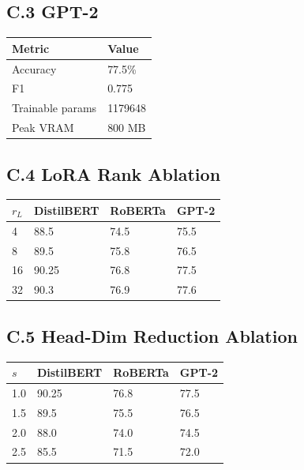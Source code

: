 \subsection{C.3 GPT-2}

\begin{table}[H]
\centering
\small
\begin{tabular}{ll}
\toprule
\textbf{Metric} & \textbf{Value} \\
\midrule
Accuracy & 77.5\% \\
F1 & 0.775 \\
Trainable params & 1179648 \\
Peak VRAM & 800 MB \\
\bottomrule
\end{tabular}
\end{table}

\subsection{C.4 LoRA Rank Ablation}

\begin{table}[H]
\centering
\small
\begin{tabular}{llll}
\toprule
\textbf{$r_L$} & \textbf{DistilBERT} & \textbf{RoBERTa} & \textbf{GPT-2} \\
\midrule
4 & 88.5 & 74.5 & 75.5 \\
8 & 89.5 & 75.8 & 76.5 \\
16 & 90.25 & 76.8 & 77.5 \\
32 & 90.3 & 76.9 & 77.6 \\
\bottomrule
\end{tabular}
\end{table}

\subsection{C.5 Head-Dim Reduction Ablation}

\begin{table}[H]
\centering
\small
\begin{tabular}{llll}
\toprule
\textbf{$s$} & \textbf{DistilBERT} & \textbf{RoBERTa} & \textbf{GPT-2} \\
\midrule
1.0 & 90.25 & 76.8 & 77.5 \\
1.5 & 89.5 & 75.5 & 76.5 \\
2.0 & 88.0 & 74.0 & 74.5 \\
2.5 & 85.5 & 71.5 & 72.0 \\
\bottomrule
\end{tabular}
\end{table}

